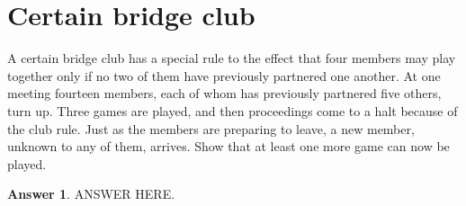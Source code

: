\documentclass[a4paper]{article}
\renewcommand{\(}{\left(}
\renewcommand{\)}{\right)}
\theoremstyle{plain}
\theoremstyle{plain}
\theoremstyle{definition}
\newtheorem*{answer}{Answer}
\begin{document}
\section{Certain bridge club}
A certain bridge club has a special rule to the effect that four members may play together only if no two of them have previously partnered one another. At one meeting fourteen members, each of whom has previously partnered five others, turn up. Three games are played, and then proceedings come to a halt because of the club rule. Just as the members are preparing to leave, a new member, unknown to any of them, arrives. Show that at least one more game can now be played.
\begin{shaded}
\begin{answer}
ANSWER HERE.
\end{answer}
\end{shaded}
\end{document}
